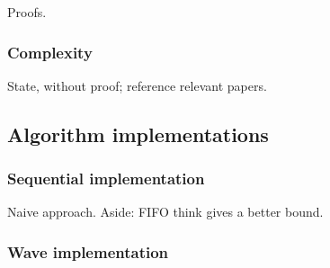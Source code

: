 Proofs.

\subsubsection{Complexity}


State, without proof; reference relevant papers.

\subsection{Algorithm implementations}

\subsubsection{Sequential implementation}



Naive approach. Aside: FIFO think gives a better bound.

\subsubsection{Wave implementation}

